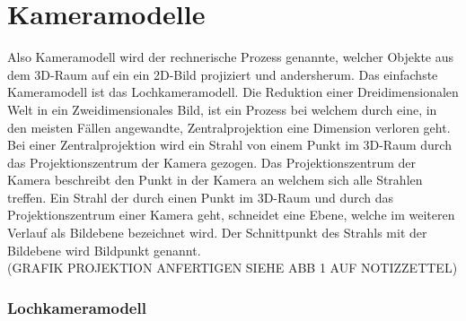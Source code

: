 \chapter{Kameramodelle}
\label{sec:CameraModels}



Also Kameramodell wird der rechnerische Prozess genannte, welcher Objekte aus dem 3D-Raum auf ein ein 2D-Bild projiziert und andersherum\cite{CamerModels.,HZ}. Das einfachste Kameramodell ist das Lochkameramodell. Die Reduktion einer Dreidimensionalen Welt in ein Zweidimensionales Bild, ist ein Prozess bei welchem durch eine, in den meisten Fällen angewandte, Zentralprojektion eine Dimension verloren geht\cite{HZ}. Bei einer Zentralprojektion wird ein Strahl von einem Punkt im 3D-Raum durch das Projektionszentrum der Kamera gezogen. Das Projektionszentrum der Kamera beschreibt den Punkt in der Kamera an welchem sich alle Strahlen treffen. Ein Strahl der durch einen Punkt im 3D-Raum und durch das Projektionszentrum einer Kamera geht, schneidet eine Ebene, welche im weiteren Verlauf als Bildebene bezeichnet wird. Der Schnittpunkt des Strahls mit der Bildebene wird Bildpunkt genannt\cite{CamerModels.,HZ}.\\


(GRAFIK PROJEKTION ANFERTIGEN SIEHE ABB 1 AUF NOTIZZETTEL)\\

\subsection{Lochkameramodell}

